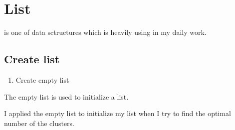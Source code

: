 \documentclass[letterpaper,12pt,english]{sphinxmanual}
\begin{document}
\section{List}
\label{\detokenize{struct:list}}
 is one of data sctructures which is heavily using in my daily work.


\subsection{Create list}
\label{\detokenize{struct:create-list}}\begin{enumerate}
\def\theenumi{\arabic{enumi}}
\def\labelenumi{\theenumi .}
\makeatletter\def\p@enumii{\p@enumi \theenumi .}\makeatother
\item {} 
Create empty list

\end{enumerate}

The empty list is used to initialize a list.

\begin{quote}

%
\begin{sphinxVerbatim}[commandchars=\\\{\}]
  \PYG{p}{[}\PYG{p}{]}
\end{sphinxVerbatim}
\end{quote}

\begin{quote}

%
\begin{sphinxVerbatim}[commandchars=\\\{\}]
\end{sphinxVerbatim}
\end{quote}

I applied the empty list to initialize my  list when I try to find the
optimal number of the clusters.
\end{document}
